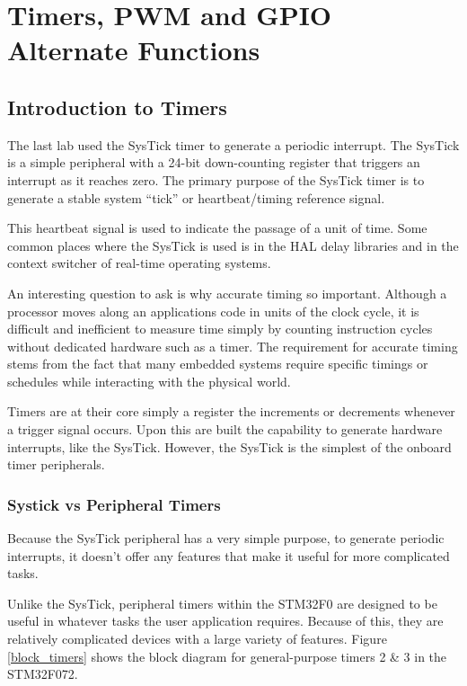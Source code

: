 \documentclass[11pt,fleqn]{book} %
\begin{document}
	
\chapter{Timers, PWM and GPIO Alternate Functions}

\section{Introduction to Timers}
The last lab used the SysTick timer to generate a periodic interrupt. The SysTick is a simple peripheral with a 24-bit down-counting register that triggers an interrupt as it reaches zero. The primary purpose of the SysTick timer is to generate a stable system ``tick'' or heartbeat/timing reference signal. 

This heartbeat signal is used to indicate the passage of a unit of time. Some common places where the SysTick is used is in the HAL delay libraries and in the context switcher of real-time operating systems. 

An interesting question to ask is why accurate timing so important. Although a processor moves along an applications code in units of the clock cycle, it is difficult and inefficient to measure time simply by counting instruction cycles without dedicated hardware such as a timer. The requirement for accurate timing stems from the fact that many embedded systems require specific timings or schedules while interacting with the physical world.

Timers are at their core simply a register the increments or decrements whenever a trigger signal occurs. Upon this are built the capability to generate hardware interrupts, like the SysTick. However, the SysTick is the simplest of the onboard timer peripherals.
    
    \subsection{Systick vs Peripheral Timers}
     Because the SysTick peripheral has a very simple purpose, to generate periodic interrupts, it doesn't offer any features that make it useful for more complicated tasks. 
     
     Unlike the SysTick, peripheral timers within the STM32F0 are designed to be useful in whatever tasks the user application requires. Because of this, they are relatively complicated devices with a large variety of features. Figure \ref{block_timers} shows the block diagram for general-purpose timers 2 \& 3 in the STM32F072.  
\end{document}
